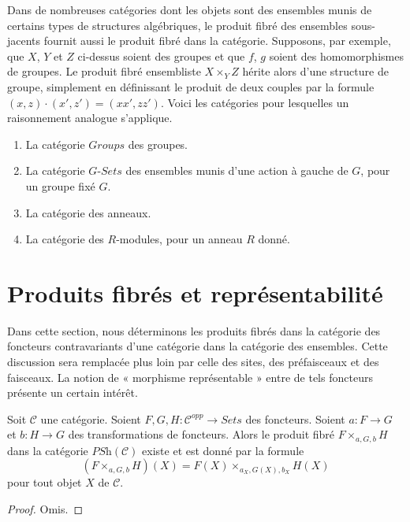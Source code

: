 \medskip\noindent
Dans de nombreuses catégories dont les objets sont des ensembles munis
de certains types de structures algébriques, le produit fibré des ensembles
sous-jacents fournit aussi le produit fibré dans la catégorie. Supposons,
par exemple, que $X$, $Y$ et $Z$ ci-dessus soient des groupes et que
$f$, $g$ soient des homomorphismes de groupes. Le produit fibré ensembliste
$X \times_Y Z$ hérite alors d'une structure de groupe, simplement en
définissant le produit de deux couples par la formule
$(x, z) \cdot (x', z') = (xx', zz')$. Voici les catégories
pour lesquelles un raisonnement analogue s'applique.
\begin{enumerate}
\item La catégorie $\textit{Groups}$ des groupes.
\item La catégorie $G\textit{-Sets}$ des ensembles
munis d'une action à gauche de $G$, pour un groupe fixé $G$.
\item La catégorie des anneaux.
\item La catégorie des $R$-modules, pour un anneau $R$ donné.
\end{enumerate}




\section{Produits fibrés et représentabilité}
\label{section-representable-map-presheaves}

\noindent
Dans cette section, nous déterminons les produits fibrés dans la
catégorie des foncteurs contravariants d'une catégorie
dans la catégorie des ensembles. Cette discussion sera remplacée plus loin
par celle des sites, des préfaisceaux et des faisceaux. La notion de
« morphisme représentable » entre de tels foncteurs présente un certain
intérêt.

\begin{lemma}
\label{lemma-fibre-product-presheaves}
Soit $\mathcal{C}$ une catégorie.
Soient $F, G, H : \mathcal{C}^{opp} \to \textit{Sets}$
des foncteurs. Soient $a : F \to G$ et $b : H \to G$ des
transformations de foncteurs. Alors le produit fibré
$F \times_{a, G, b} H$ dans la catégorie
$\textit{PSh}(\mathcal{C})$
existe et est donné par la formule
$$
(F \times_{a, G, b} H)(X) =
F(X) \times_{a_X, G(X), b_X} H(X)
$$
pour tout objet $X$ de $\mathcal{C}$.
\end{lemma}

\begin{proof}
Omis.
\end{proof}

